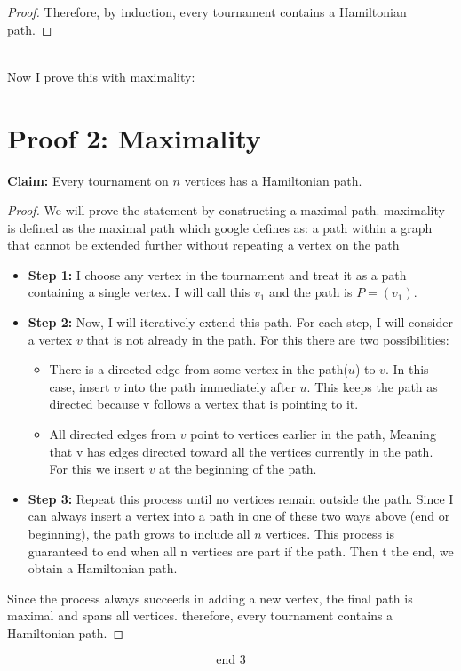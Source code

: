 \documentclass[10pt, AMS Euler]{article}
\begin{document}
\begin{enumerate}
\begin{proof}
    Therefore, by induction, every tournament contains a Hamiltonian path.
\end{proof}
\\ Now I prove this with maximality:
\section*{Proof 2: Maximality}

\noindent\textbf{Claim:} Every tournament on $n$ vertices has a Hamiltonian path.

\begin{proof}
    We will prove the statement by constructing a maximal path. maximality is defined as the maximal path which google defines as: a path within a graph that cannot be extended further without repeating a vertex on the path

    \begin{itemize}
        \item \textbf{Step 1:} I choose any vertex in the tournament and treat it as a path containing a single vertex. I will call this $v_{1}$ and the path is $P=(v_{1})$. 
        
        \item \textbf{Step 2:} Now, I will iteratively extend this path. For each step, I will consider a vertex $v$ that is not already in the path. For this there are two possibilities:
        \begin{itemize}
            \item There is a directed edge from some vertex in the path($u$) to $v$. In this case, insert $v$ into the path immediately after $u$. This keeps the path as directed because v follows a vertex that is pointing to it. 
            \item All directed edges from $v$ point to vertices earlier in the path, Meaning that v has edges directed toward all the vertices currently in the path. For this we insert $v$ at the beginning of the path.
        \end{itemize}
        
        \item \textbf{Step 3:} Repeat this process until no vertices remain outside the path. Since I can always insert a vertex into a path in one of these two ways above (end or beginning), the path grows to include all $n$ vertices. This process is guaranteed to end when all n vertices are part if the path. Then t the end, we obtain a Hamiltonian path. 
    \end{itemize}
    
    Since the process always succeeds in adding a new vertex, the final path is maximal and spans all vertices. therefore, every tournament contains a Hamiltonian path.
\end{proof}
		\end{enumerate}
        \[
        \boxed{\text{end 3}}
        \]
		
\end{document}
